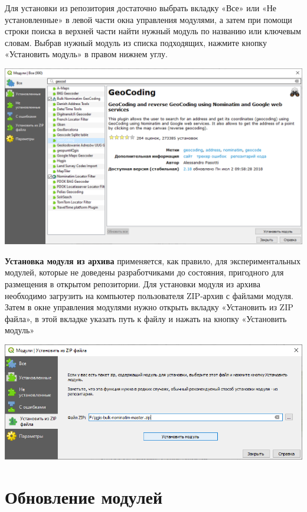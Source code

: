 \documentclass[
  12pt,
]{book}
\begin{document}
Для установки из репозитория достаточно выбрать вкладку «Все» или «Не установленные» в левой части окна управления модулями, а затем при помощи строки поиска в верхней части найти нужный модуль по названию или ключевым словам. Выбрав нужный модуль из списка подходящих, нажмите кнопку «Установить модуль» в правом нижнем углу.

\includegraphics{images/Man02_InstallModules/Modules02.png}

\textbf{Установка модуля из архива} применяется, как правило, для экспериментальных модулей, которые не доведены разработчиками до состояния, пригодного для размещения в открытом репозитории.
Для установки модуля из архива необходимо загрузить на компьютер пользователя ZIP-архив с файлами модуля. Затем в окне управления модулями нужно открыть вкладку «Установить из ZIP файла», в этой вкладке указать путь к файлу и нажать на кнопку «Установить модуль»

\includegraphics{images/Man02_InstallModules/Modules03.png}

\hypertarget{manual-plugins-update}{%
\section{Обновление модулей}\label{manual-plugins-update}}
\end{document}
